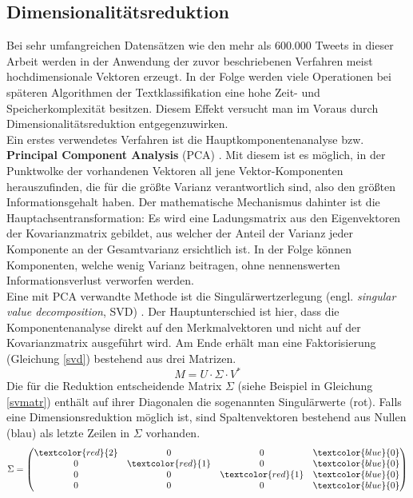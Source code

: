 \subsection{Dimensionalitätsreduktion}\label{dim-red}
Bei sehr umfangreichen Datensätzen wie den mehr als 600.000 Tweets in dieser Arbeit werden in der Anwendung der zuvor beschriebenen Verfahren meist hochdimensionale Vektoren erzeugt. In der Folge werden viele Operationen bei späteren Algorithmen der Textklassifikation eine hohe Zeit- und Speicherkomplexität besitzen. Diesem Effekt versucht man im Voraus durch Dimensionalitätsreduktion entgegenzuwirken.\\
Ein erstes verwendetes Verfahren ist die Hauptkomponentenanalyse bzw. \textbf{Principal Component Analysis} (PCA) \citep{Jol02}. Mit diesem ist es möglich, in der Punktwolke der vorhandenen Vektoren all jene Vektor-Komponenten herauszufinden, die für die größte Varianz verantwortlich sind, also den größten Informationsgehalt haben. Der mathematische Mechanismus dahinter ist die Hauptachsentransformation: Es wird eine Ladungsmatrix aus den Eigenvektoren der Kovarianzmatrix gebildet, aus welcher der Anteil der Varianz jeder Komponente an der Gesamtvarianz ersichtlich ist. In der Folge können Komponenten, welche wenig Varianz beitragen, ohne nennenswerten Informationsverlust verworfen werden.\\
Eine mit PCA verwandte Methode ist die Singulärwertzerlegung (engl. \textit{singular value decomposition}, SVD) \citep{baker13}. Der Hauptunterschied ist hier, dass die Komponentenanalyse direkt auf den Merkmalvektoren und nicht auf der Kovarianzmatrix ausgeführt wird. Am Ende erhält man eine Faktorisierung (Gleichung \ref{svd}) bestehend aus drei Matrizen.
\begin{equation}
	M = U \cdot \Sigma \cdot V^*
	\label{svd}
\end{equation}
Die für die Reduktion entscheidende Matrix $\Sigma$ (siehe Beispiel in Gleichung \ref{svmatr}) enthält auf ihrer Diagonalen die sogenannten Singulärwerte (rot). Falls eine Dimensionsreduktion möglich ist, sind Spaltenvektoren bestehend aus Nullen (blau) als letzte Zeilen in $\Sigma$ vorhanden.
\begin{equation}
	\Sigma =
\begin{pmatrix}
\textcolor{red}{2}& 0 & 0 & \textcolor{blue}{0} \\
0 & \textcolor{red}{1} & 0 & \textcolor{blue}{0} \\
0 &0 & \textcolor{red}{1} & \textcolor{blue}{0} \\
                0 & 0 & 0 & \textcolor{blue}{0}
\end{pmatrix}
\label{svmatr}
\end{equation} 
\pagebreak
